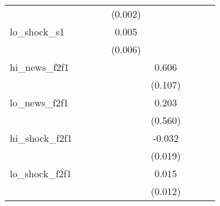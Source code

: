 {\begin{tabular}{l*{8}{c}}
            &                     &                     &                     &     (0.002)         &                     &                     &                     &                     \\
\addlinespace
lo\_shock\_s1 &                     &                     &                     &       0.005         &                     &                     &                     &                     \\
            &                     &                     &                     &     (0.006)         &                     &                     &                     &                     \\
\addlinespace
hi\_news\_f2f1&                     &                     &                     &                     &       0.606\sym{***}&                     &                     &                     \\
            &                     &                     &                     &                     &     (0.107)         &                     &                     &                     \\
\addlinespace
lo\_news\_f2f1&                     &                     &                     &                     &       0.203         &                     &                     &                     \\
            &                     &                     &                     &                     &     (0.560)         &                     &                     &                     \\
\addlinespace
hi\_shock\_f2f1&                     &                     &                     &                     &      -0.032\sym{*}  &                     &                     &                     \\
            &                     &                     &                     &                     &     (0.019)         &                     &                     &                     \\
\addlinespace
lo\_shock\_f2f1&                     &                     &                     &                     &       0.015         &                     &                     &                     \\
            &                     &                     &                     &                     &     (0.012)         &                     &                     &                     \\

\end{tabular}}
